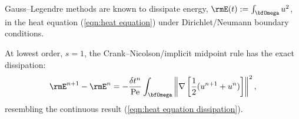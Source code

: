     \line
    
    \begin{example}
        Gauss–Legendre methods are known to dissipate energy, $\rmE(t)  :=  \int_{\bfOmega}u^{2}$, in the heat equation (\ref{eqn:heat equation}) under Dirichlet/Neumann boundary conditions.
        
        At lowest order, $s  =  1$, the Crank–Nicolson/implicit midpoint rule has the exact dissipation:
        \begin{equation}
            \rmE^{n + 1} - \rmE^{n}  =  - \frac{\delta t^{n}}{\rmPe}\int_{\bfOmega}\left\|\nabla\left[\frac{1}{2}(u^{n + 1} + u^{n})\right]\right\|^{2},
        \end{equation}
        resembling the continuous result (\ref{eqn:heat equation dissipation}).
    \end{example}
    
    \begin{example}
    \end{example}
    \line


    